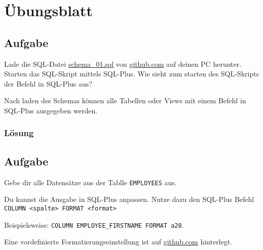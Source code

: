 \section{Übungsblatt}
\label{sec:uebung_01}

\subsection{Aufgabe}
\label{sec:uebung_01.aufgabe_01}
Lade die SQL-Datei \href{https://raw.githubusercontent.com/fh-trier/tgdb_ws1819/master/sql/schema_01.sql}{schema\_01.sql} von \href{https://raw.githubusercontent.com/fh-trier/tgdb_ws1819/master/sql/schema_01.sql}{github.com} auf deinen PC herunter. Starten das SQL-Skript mittels SQL-Plus. Wie sieht zum starten des SQL-Skripts der Befehl in SQL-Plus aus?

\begin{info-popup}
  Nach laden des Schemas können alle Tabellen oder Views mit einem Befehl in SQL-Plus ausgegeben werden. \\
\end{info-popup}

\subsubsection*{Lösung}
\label{sec:uebung_01.aufgabe_01.loesung}

\subsection{Aufgabe}
\label{sec:uebung_01.aufgabe_02}
Gebe dir alle Datensätze aus der Tablle \texttt{EMPLOYEES} aus.

\begin{info-popup}
Du kannst die Ausgabe in SQL-Plus anpassen. Nutze dazu den SQL-Plus Befehl
\texttt{COLUMN <spalte> FORMAT <format>}

Beispielsweise: \texttt{COLUMN EMPLOYEE\_FIRSTNAME FORMAT a20}.

Eine vordefinierte Formatierungseinstellung ist auf \href{https://raw.githubusercontent.com/fh-trier/tgdb_ws1819/master/sql/sqlplus-settings.sql}{github.com} hinterlegt.

\end{info-popup}

